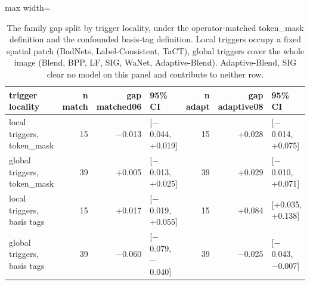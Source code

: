 \begin{table}[htbp]
\centering
\small
\caption{The family gap split by trigger locality, under the operator-matched token_mask definition and the confounded basis-tag definition. Local triggers occupy a fixed spatial patch (BadNets, Label-Consistent, TaCT), global triggers cover the whole image (Blend, BPP, LF, SIG, WaNet, Adaptive-Blend). Adaptive-Blend, SIG clear no model on this panel and contribute to neither row.}
\label{tab:family-split-local-global}
\begin{adjustbox}{max width=\linewidth}
\begin{tabular}{lrrlrrl}
\toprule
trigger locality & n match & gap matched06 & 95\% CI & n adapt & gap adaptive08 & 95\% CI \\
\midrule
local triggers, token\_mask & 15 & $-$0.013 & [$-$0.044, +0.019] & 15 & +0.028 & [$-$0.014, +0.075] \\
global triggers, token\_mask & 39 & +0.005 & [$-$0.013, +0.025] & 39 & +0.029 & [$-$0.010, +0.071] \\
local triggers, basis tags & 15 & +0.017 & [$-$0.019, +0.055] & 15 & +0.084 & [+0.035, +0.138] \\
global triggers, basis tags & 39 & $-$0.060 & [$-$0.079, $-$0.040] & 39 & $-$0.025 & [$-$0.043, $-$0.007] \\
\bottomrule
\end{tabular}
\end{adjustbox}
\end{table}

